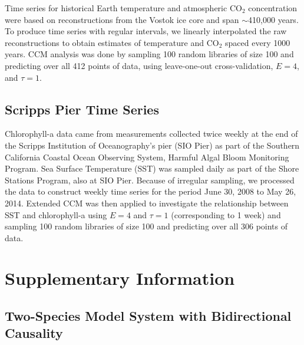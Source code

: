 Time series for historical Earth temperature and atmospheric CO$_2$ concentration were based on reconstructions from the Vostok ice core \cite{Veilleux_1976} and span $\sim$410,000 years. To produce time series with regular intervals, we linearly interpolated the raw reconstructions to obtain estimates of temperature and CO$_2$ spaced every 1000 years. CCM analysis was done by sampling 100 random libraries of size 100 and predicting over all 412 points of data, using leave-one-out cross-validation, $E = 4$, and $\tau = 1$.

\subsection{Scripps Pier Time Series}

Chlorophyll-a data came from measurements collected twice weekly at the end of the Scripps Institution of Oceanography's pier (SIO Pier) as part of the Southern California Coastal Ocean Observing System, Harmful Algal Bloom Monitoring Program. Sea Surface Temperature (SST) was sampled daily as part of the Shore Stations Program, also at SIO Pier. Because of irregular sampling, we processed the data to construct weekly time series for the period June 30, 2008 to May 26, 2014. Extended CCM was then applied to investigate the relationship between SST and chlorophyll-a using $E = 4$ and $\tau = 1$ (corresponding to 1 week) and sampling 100 random libraries of size 100 and predicting over all 306 points of data.

\section{Supplementary Information}

\subsection{Two-Species Model System with Bidirectional Causality}

